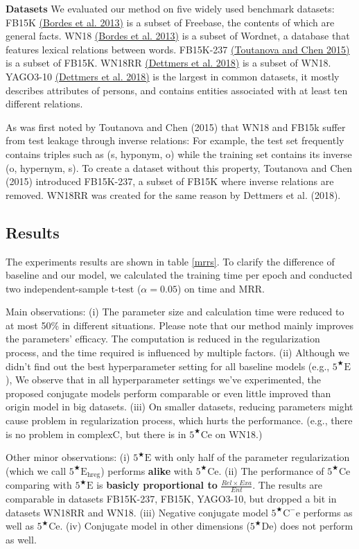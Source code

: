 \documentclass[11pt]{article}
\begin{document}
\textbf{Datasets} 
We evaluated our method on five widely used benchmark datasets: 
FB15K
\hyperlink{Bor13}{(Bordes et al. 2013)} is a subset of Freebase, the contents of which are general facts.
WN18 
\hyperlink{Bor13}{(Bordes et al. 2013)} is a subset of Wordnet, a database that features lexical relations between words.
FB15K-237 
\hyperlink{Tou15}{(Toutanova and Chen 2015)} is a subset of FB15K.
WN18RR 
\hyperlink{Det18}{(Dettmers et al. 2018)} is a subset of WN18.
YAGO3-10
\hyperlink{Det18}{(Dettmers et al. 2018)} is the largest in common datasets, it mostly describes attributes of persons, and contains entities associated with at least ten different relations.

As was first noted by Toutanova and Chen (2015) that WN18 and FB15k suffer from test leakage through inverse relations:
For example, the test set frequently contains triples such as (s, hyponym, o) while the training set contains its inverse (o, hypernym, s).
To create a dataset without this property, Toutanova and Chen (2015) introduced FB15K-237, a subset of FB15K where inverse relations are removed. 
WN18RR was created for the same reason by Dettmers et al. (2018).

\subsection{Results}
The experiments results are shown in table \ref{mrrs}.
To clarify the difference of baseline and our model, we calculated the training time per epoch
and conducted two independent-sample t-test ($\alpha=0.05$) on time and MRR.

Main observations:
(i) The parameter size and calculation time were reduced to at most 50\% in different situations.
Please note that our method mainly improves the parameters' efficacy. 
The computation is reduced in the regularization process, and the time required is influenced by multiple factors.
(ii) Although we didn't find out the best hyperparameter setting for all baseline models (e.g., $5^{\bigstar}\mathrm{E}$),
We observe that in all hyperparameter settings we've experimented, the proposed conjugate models perform comparable or even little improved than origin model in big datasets.
(iii) On smaller datasets, reducing parameters might cause problem in regularization process, which hurts the performance. 
(e.g., there is no problem in $\mathrm{complexC}$, but there is in $5^{\bigstar}\mathrm{Ce}$ on WN18.)

Other minor observations:
(i) $5^{\bigstar}\mathrm{E}$ with only half of the parameter regularization (which we call $5^{\bigstar}\mathrm{E_{hreg}}$) performs \textbf{alike} with $5^{\bigstar}\mathrm{Ce}$.
(ii) The performance of $5^{\bigstar}\mathrm{Ce}$ comparing with $5^{\bigstar}\mathrm{E}$ is \textbf{basicly proportional to} $\frac{Rel\times Exa}{Ent}$. 
The results are comparable in datasets FB15K-237, FB15K, YAGO3-10, but dropped a bit in datasets WN18RR and WN18.
(iii) Negative conjugate model $5^{\bigstar}\mathrm{C^{-}e}$ performs as well as $5^{\bigstar}\mathrm{Ce}$.
(iv) Conjugate model in other dimensions ($5^{\bigstar}\mathrm{De}$) does not perform as well.
\end{document}
